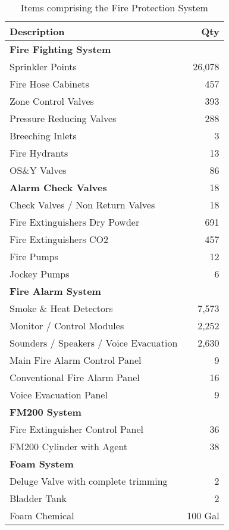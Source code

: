 \begin{table}[h]
\begin{tabular}{lr}
\toprule
\textbf{Description}	 &\textbf{Qty}\\
\midrule 	 
\textbf{Fire Fighting System}	 &\\
Sprinkler Points	    &26,078\\
Fire Hose Cabinets	    &457 \\
Zone Control Valves	    &393 \\
Pressure Reducing Valves	 &288 \\
Breeching Inlets	        &3\\ 
Fire Hydrants	            &13\\ 
OS\&Y Valves	               &86\\ 
\textbf{Alarm Check Valves}	              &18 \\
Check Valves / Non Return Valves &18 \\
Fire Extinguishers Dry Powder	 &691 \\
Fire Extinguishers CO2	           &457 \\
Fire Pumps	                     &12 \\
Jockey Pumps	                     &6 \\
\midrule 	 
\textbf{Fire Alarm System}	 &\\
Smoke \& Heat Detectors	 &7,573 \\
Monitor / Control Modules	       &2,252 \\
Sounders / Speakers / Voice Evacuation	   &2,630 \\
Main Fire Alarm Control Panel	         &9 \\
Conventional Fire Alarm Panel	        &16 \\
Voice Evacuation Panel	                  &9 \\
\midrule 
\textbf{FM200 System}	 &\\
Fire Extinguisher Control Panel	&36 \\
FM200 Cylinder with Agent	            &38 \\
\midrule 	 
\textbf{Foam System}	 &\\
Deluge Valve with complete trimming	 &2 \\
Bladder Tank	                        &2 \\
Foam Chemical	                   &100 Gal\\
\bottomrule
\end{tabular}
\caption{Items comprising the Fire Protection System}
\label{fireitems}
\end{table}

